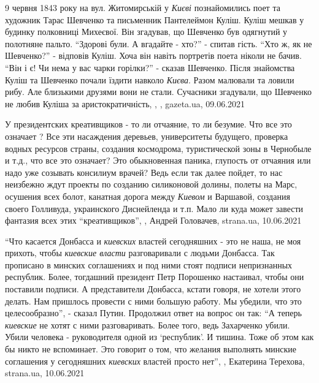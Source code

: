 9 червня 1843 року на вул. Житомирській у \emph{Києві} познайомились поет та
художник Тарас Шевченко та письменник Пантелеймон Куліш. Куліш мешкав у
будинку полковниці Михеєвої. Він згадував, що Шевченко був одягнутий у
полотняне пальто. \enquote{Здорові були. А вгадайте - хто?} - спитав гість.
\enquote{Хто ж, як не Шевченко?} - відповів Куліш. Хоча він навіть портретів
поета ніколи не бачив.  \enquote{Він і є! Чи нема у вас чарки горілки?} -
сказав Шевченко.  Після знайомства Куліш та Шевченко почали їздити навколо
\emph{Києва}. Разом малювали та ловили рибу.  Але близькими друзями вони не
стали. Сучасники згадували, що Шевченко не любив Куліша за аристократичність,
, , gazeta.ua, 09.06.2021

У президентских креативщиков - то ли отчаяние, то ли безумие. Что все это
означает ?  Все эти насаждения деревьев, университеты будущего, проверка
водных ресурсов страны, создания космодрома, туристической зоны в Чернобыле и
т.д., что все это означает?  Это обыкновенная паника, глупость от отчаяния или
надо уже созывать консилиум врачей?  Ведь если так далее пойдет, то нас
неизбежно ждут проекты по созданию силиконовой долины, полеты на Марс,
осушения всех болот, канатная дорога между \emph{Киевом} и Варшавой, создания своего
Голливуда, украинского Диснейленда и т.п. Мало ли куда может завести фантазия
всех этих \enquote{креативщиков},
, Андрей Головачев, strana.ua, 10.06.2021

\enquote{Что касается Донбасса и \emph{киевских} властей сегодняшних - это не
наша, не моя прихоть, чтобы \emph{киевские власти} разговаривали с людьми
Донбасса. Так прописано в минских соглашениях и под ними стоят подписи
непризнанных республик. Более, тогдашний президент Петр Порошенко настаивал,
чтобы они поставили подписи. А представители Донбасса, кстати говоря, не хотели
этого делать. Нам пришлось провести с ними большую работу. Мы убедили, что это
целесообразно}, - сказал Путин. Продолжил ответ на вопрос он так: \enquote{А
теперь \emph{киевские} не хотят с ними разговаривать. Более того, ведь
Захарченко убили. Убили человека - руководителя одной из \enquote{республик}. И
тишина. Тоже об этом как бы никто не вспоминает. Это говорит о том, что желания
выполнять минские соглашения у сегодняшних \emph{киевских} властей просто нет},
, 
Екатерина Терехова, strana.ua, 10.06.2021


